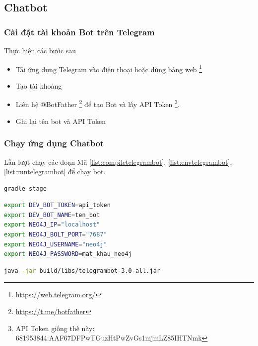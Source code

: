 \subsection{Chatbot}
\subsubsection{Cài đặt tài khoản Bot trên Telegram}
Thực hiện các bước sau
\begin{itemize}
\item Tải ứng dụng Telegram vào điện thoại hoặc dùng bảng web \footnote{\url{https://web.telegram.org/}}
\item Tạo tài khoảng 
\item Liên hệ @BotFather \footnote{\url{https://t.me/botfather}} để tạo Bot và lấy API Token \footnote{API Token giống thế này: 681953844:AAF67DFPwTGuzHtPwZvGs1mjmLZ85IHTNmk}. 
\item Ghi lại tên bot và API Token 
\end{itemize}

\subsubsection{Chạy ứng dụng Chatbot}

Lần lượt chạy các đoạn Mã \ref{list:compiletelegrambot}, \ref{list:envtelegrambot}, \ref{list:runtelegrambot} để chạy bot. 

\begin{lstlisting}[language=bash,caption={Biên dịch mã nguồn},label={list:compiletelegrambot}]
gradle stage 
\end{lstlisting}

\begin{lstlisting}[language=bash,caption={Tạo các biến môi trường},label={list:envtelegrambot}]
export DEV_BOT_TOKEN=api_token
export DEV_BOT_NAME=ten_bot
export NEO4J_IP="localhost" 
export NEO4J_BOLT_PORT="7687"
export NEO4J_USERNAME="neo4j"
export NEO4J_PASSWORD=mat_khau_neo4j
\end{lstlisting}

\begin{lstlisting}[language=bash,caption={Chạy bot},label={list:runtelegrambot}]
java -jar build/libs/telegrambot-3.0-all.jar
\end{lstlisting}





